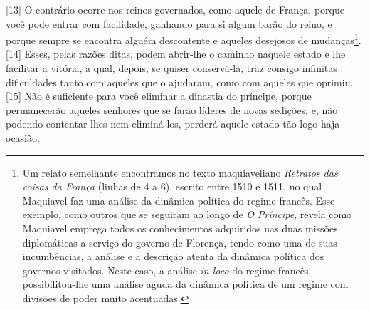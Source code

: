 {[}13{]} O contrário ocorre nos reinos governados, como aquele de
França, porque você pode entrar com facilidade, ganhando para si algum
barão do reino, e porque sempre se encontra alguém descontente e aqueles
desejosos de mudanças\footnote{Um relato semelhante encontramos no texto
  maquiaveliano \emph{Retratos das coisas da França} (linhas de 4 a 6),
  escrito entre 1510 e 1511, no qual Maquiavel faz uma análise da
  dinâmica política do regime francês. Esse exemplo, como outros que se
  seguiram ao longo de \emph{O Príncipe}, revela como Maquiavel emprega
  todos os conhecimentos adquiridos nas duas missões diplomáticas a
  serviço do governo de Florença, tendo como uma de suas incumbências, a
  análise e a descrição atenta da dinâmica política dos governos
  visitados. Neste caso, a análise \emph{in loco} do regime francês
  possibilitou-lhe uma análise aguda da dinâmica política de um regime
  com divisões de poder muito acentuadas.}. {[}14{]} Esses, pelas razões
ditas, podem abrir-lhe o caminho naquele estado e lhe facilitar a
vitória, a qual, depois, se quiser conservá-la, traz consigo infinitas
dificuldades tanto com aqueles que o ajudaram, como com aqueles que
oprimiu. {[}15{]} Não é suficiente para você eliminar a dinastia do
príncipe, porque permanecerão aqueles senhores que se farão líderes de
novas sedições: e, não podendo contentar-lhes nem eliminá-los, perderá
aquele estado tão logo haja ocasião.

